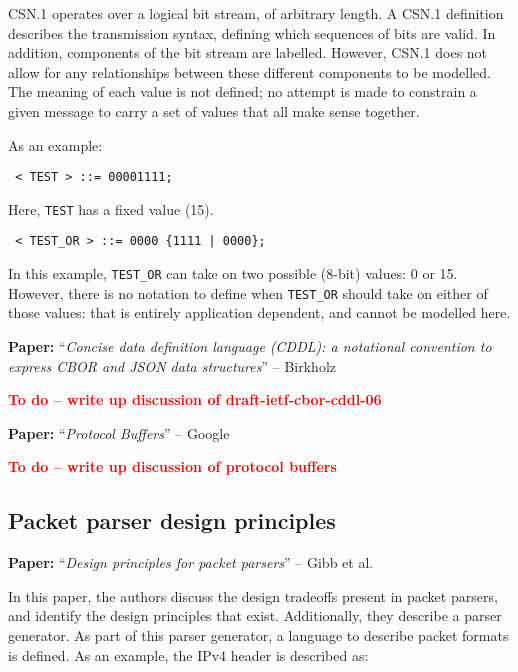 \documentclass[10pt,a4paper]{article}
\newcommand{\todo}[1]{\textbf{\textcolor{red}{To do -- #1}}}
\newcommand{\paper}[3]{\vspace{4mm}\noindent\textbf{Paper:} ``\textit{#1}'' -- #2 \cite{#3}\vspace{3mm}}
\begin{document}
CSN.1 operates over a logical bit stream, of arbitrary length. A CSN.1 definition
describes the transmission syntax, defining which sequences of bits are valid. In
addition, components of the bit stream are labelled. However, CSN.1 does not allow for any
relationships between these different components to be modelled. The meaning of each value
is not defined; no attempt is made to constrain a given message to carry a set of values
that all make sense together.

As an example:

\begin{verbatim} < TEST > ::= 00001111; \end{verbatim}

Here, \texttt{TEST} has a fixed value (15).

\begin{verbatim} < TEST_OR > ::= 0000 {1111 | 0000}; \end{verbatim}

In this example, \texttt{TEST\_OR} can take on two possible (8-bit) values: 0 or 15.
However, there is no notation to define when \texttt{TEST\_OR} should take on either of
those values: that is entirely application dependent, and cannot be modelled here.

\paper{Concise data definition language (CDDL): a notational convention to
       express CBOR and JSON data structures}{Birkholz}{draft-ietf-cbor-cddl-06}

\todo{write up discussion of draft-ietf-cbor-cddl-06}

\paper{Protocol Buffers}{Google}{protocol-buffers}

\todo{write up discussion of protocol buffers}

\subsection{Packet parser design principles}

\paper{Design principles for packet parsers}{Gibb et al.}{gibb2013design}

In this paper, the authors discuss the design tradeoffs present in packet parsers, and
identify the design principles that exist. Additionally, they describe a parser generator.
As part of this parser generator, a language to describe packet formats is defined.
As an example, the IPv4 header is described as:
\end{document}
